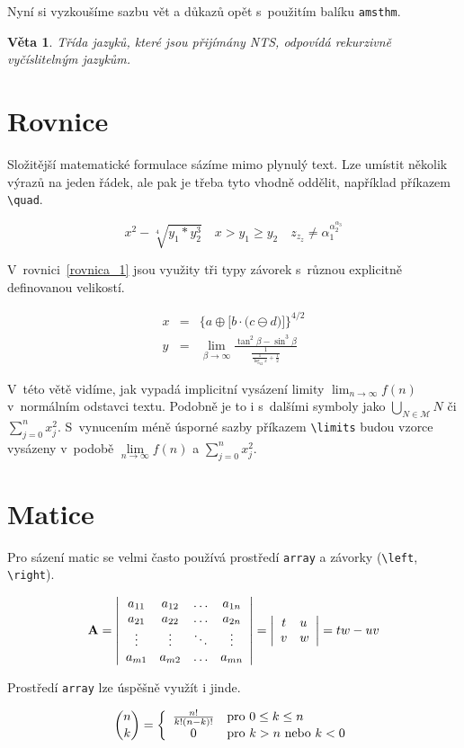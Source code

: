 \documentclass[a4paper, twocolumn, 11pt]{article}
\newtheorem{definition_2}{Věta}
\begin{document}
        Nyní si vyzkoušíme sazbu vět a důkazů opět s~použitím balíku \verb|amsthm|.
    \begin{definition_2}
        Třída jazyků, které jsou přijímány NTS, odpovídá \emph{rekurzivně vyčíslitelným jazykům.}
    \end{definition_2}
        
    
\section{Rovnice}

    Složitější matematické formulace sázíme mimo plynulý text. Lze umístit několik výrazů na jeden řádek, ale pak je třeba tyto vhodně oddělit, například příkazem \verb|\quad|.
    
    $$x^2 - \sqrt[4]{y_1 * y_2^3} \quad x > y_1\geq y_2 \quad z_{z_z} \neq \alpha_1^{\alpha_2^{\alpha_3}} $$
    
    V~rovnici~\eqref{rovnica_1} jsou využity tři typy závorek s~různou explicitně definovanou velikostí.
    
    \begin{eqnarray}
    	x & = & \bigg\{ a \oplus \Big[ b \cdot  \big(c \ominus d\big)\Big] \bigg\}^{4/2}\label{rovnica_1}\\
    	y & = &\lim_{\beta \rightarrow \infty} \frac{\tan^2 \beta - \sin^3 \beta} {\frac{1}{\frac{1}{\log_{42}x}+ \frac{1}{2}}}\label{rovnica_2}
    \end{eqnarray}
    
    V~této větě vidíme, jak vypadá implicitní vysázení limity $\lim_{n \rightarrow\infty}f(n)$ v~normálním odstavci textu. Podobně je to i s~dalšími symboly jako $\bigcup_{N \in \mathcal{M}} N$ či $\sum^{n}_{j=0} x^{2}_{j}$. S~vynucením méně úsporné sazby příkazem \verb|\limits| budou vzorce vysázeny v~podobě $\lim\limits_{n \rightarrow \infty} f(n)$ a $\sum\limits_{j=0}^{n} x^{2}_{j}$. 
    
\section{Matice}

    Pro sázení matic se velmi často používá prostředí \verb|array| a závorky (\verb|\left|, \verb|\right|).
    
    $$\mathbf{A} = \left |
	\begin{array}{cccc}
		a_{11} & a_{12} & \ldots &  a_{1n}\\
		a_{21} & a_{22} & \ldots &  a_{2n}\\
		\vdots & \vdots & \ddots &  \vdots\\
		a_{m1} & a_{m2} & \ldots &  a_{mn}
	\end{array}
	\right | = \left |
	\begin{array}{c l}
		t & u \\
		v & w
	\end{array}
	\right| = tw - uv$$

    Prostředí \verb|array| lze úspěšně využít i jinde.
    
    $$ \binom{n}{k} = \left \{
	\begin{array}{c l}
		\frac{n!}{k!(n-k)!} & \text{pro } 0 \leq k\leq n \\
		0                   & \text{pro } k > n  \text{ nebo } k < 0 \\
	\end{array}
	\right. $$
\end{document}

